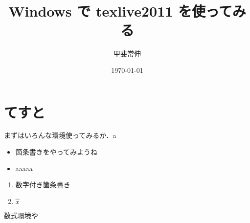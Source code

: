 \documentclass[a4j, 10pt, fleqn, twocolumn]{jsarticle}
\title{Windows で texlive2011 を使ってみる}
\author{甲斐常伸}
\date{\today}
\begin{document}
\maketitle
\section{てすと}
まずはいろんな環境使ってみるか．a
\begin{itemize}
 \item 箇条書きをやってみようね
 \item aaaaa
\end{itemize}
\begin{enumerate}
 \item 数字付き箇条書き
 \item $\hat{x}$
\end{enumerate}
数式環境や
\end{document}
